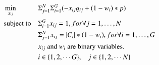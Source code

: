 \documentclass[10pt,journal,compsoc]{IEEEtran}
\theoremstyle{mytheoremstyle}
\theoremstyle{mytheoremstyle}
\theoremstyle{mytheoremstyle}
\newcommand{\ie}{i.e., }
\newcommand{\bigO}{\ensuremath{\mathcal{O}}}%
\begin{document}





\begin{equation}
\begin{aligned}
     &\min\limits_{x_{ij}} && \Sigma_{j=1}^N\Sigma_{i=1}^G (-x_{ij}q_{ij} + (1-w_i)*p) \\
     &\text{subject to}   && \Sigma_{i=1}^G x_{ij} = 1, for \forall j=1, \ldots, N \\
   &&& \Sigma_{j=1}^N x_{ij} = |C_i|*(1-w_i), for \forall i=1, \ldots, G \\
   &&& \text{$x_{ij}$ and $w_i$ are binary variables.}\\
   &&& i\in \{1,2, \cdots G\}, \hspace{0.3cm} j\in \{1,2,\cdots N\}
\end{aligned}
\label{centralized_opt}
\end{equation}
\end{document}
